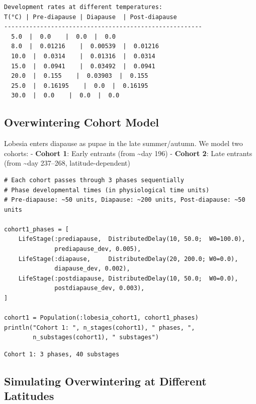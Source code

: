 \begin{verbatim}
Development rates at different temperatures:
T(°C) | Pre-diapause | Diapause  | Post-diapause
-------------------------------------------------------
  5.0  |  0.0    |  0.0  |  0.0
  8.0  |  0.01216    |  0.00539  |  0.01216
  10.0  |  0.0314    |  0.01316  |  0.0314
  15.0  |  0.0941    |  0.03492  |  0.0941
  20.0  |  0.155    |  0.03903  |  0.155
  25.0  |  0.16195    |  0.0  |  0.16195
  30.0  |  0.0    |  0.0  |  0.0
\end{verbatim}



\subsection{Overwintering Cohort Model}



\label{1290006660006599923}{}


Lobesia enters diapause as pupae in the late summer/autumn. We model two cohorts: - \textbf{Cohort 1}: Early entrants (from {\textasciitilde}day 196) - \textbf{Cohort 2}: Late entrants (from {\textasciitilde}day 237–268, latitude-dependent)




\begin{verbatim}
# Each cohort passes through 3 phases sequentially
# Phase developmental times (in physiological time units)
# Pre-diapause: ~50 units, Diapause: ~200 units, Post-diapause: ~50 units

cohort1_phases = [
    LifeStage(:prediapause,  DistributedDelay(10, 50.0;  W0=100.0),
              prediapause_dev, 0.005),
    LifeStage(:diapause,     DistributedDelay(20, 200.0; W0=0.0),
              diapause_dev, 0.002),
    LifeStage(:postdiapause, DistributedDelay(10, 50.0;  W0=0.0),
              postdiapause_dev, 0.003),
]

cohort1 = Population(:lobesia_cohort1, cohort1_phases)
println("Cohort 1: ", n_stages(cohort1), " phases, ",
        n_substages(cohort1), " substages")
\end{verbatim}




\begin{verbatim}
Cohort 1: 3 phases, 40 substages
\end{verbatim}



\subsection{Simulating Overwintering at Different Latitudes}



